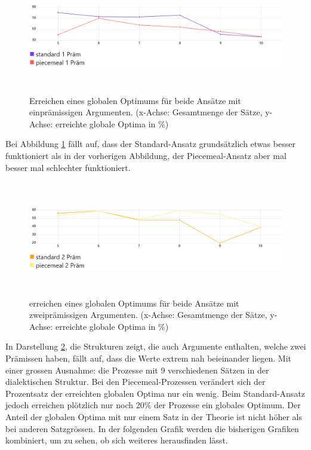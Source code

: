 \documentclass{article}
\begin{document}
\begin{figure}[t]
  \centering
  \includegraphics[width=\textwidth,height=5cm,keepaspectratio]{images/global_optima_standard_piecemeal_1prem.png}
  \caption{Erreichen eines globalen Optimums für beide Ansätze mit einprämissigen Argumenten. (x-Achse: Gesamtmenge der Sätze, y-Achse: erreichte globale Optima in \%) \label{fig:GlobOptPoolsizeLineOnePrem}}
\end{figure}

Bei Abbildung \ref{fig:GlobOptPoolsizeLineOnePrem} fällt auf, dass der Standard-Ansatz grundsätzlich etwas besser funktioniert als in der vorherigen Abbildung, der Piecemeal-Ansatz aber mal besser mal schlechter funktioniert.


\begin{figure}[htbp]
  \centering
  \includegraphics[width=\textwidth,height=5cm,keepaspectratio]{images/global_optima_standard_piecemeal_2prem.png}
  \caption{erreichen eines globalen Optimums für beide Ansätze mit zweiprämissigen Argumenten. (x-Achse: Gesamtmenge der Sätze, y-Achse: erreichte globale Optima in \%) \label{fig:GlobOptPoolsizeLineTwoPrem}}
\end{figure}

In Darstellung \ref{fig:GlobOptPoolsizeLineTwoPrem}, die Strukturen zeigt, die auch Argumente enthalten, welche zwei Prämissen haben, fällt auf, dass die Werte extrem nah beieinander liegen. Mit einer grossen Ausnahme: die Prozesse mit 9 verschiedenen Sätzen in der dialektischen Struktur. Bei den Piecemeal-Prozessen verändert sich der Prozentsatz der erreichten globalen Optima nur ein wenig. Beim Standard-Ansatz jedoch erreichen plötzlich nur noch 20\% der Prozesse ein globales Optimum. Der Anteil der globalen Optima mit nur einem Satz in der Theorie ist nicht höher als bei anderen Satzgrössen. In der folgenden Grafik werden die bisherigen Grafiken kombiniert, um zu sehen, ob sich weiteres herausfinden lässt.
\end{document}
